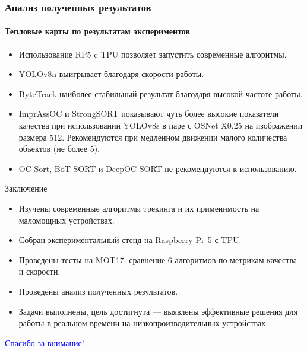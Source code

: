 \documentclass{beamer} %
\begin{document}
\begin{frame}
  \frametitle{Анализ полученных результатов}
  \framesubtitle{Тепловые карты по результатам экспериментов}
  \begin{itemize}
    \item Использование RP5 c TPU позволяет запустить современные алгоритмы.
    \item YOLOv8n выигрывает благодаря скорости работы.
    \item ByteTrack наиболее стабильный результат благодаря высокой частоте работы.
    \item ImprAssOC и StrongSORT показывают чуть более высокие показатели качества при использовании YOLOv8s в паре с OSNet X0.25 на изображении размера 512. Рекомендуются при медленном движении малого количества объектов (не более 5).
    \item OC-Sort, BoT-SORT и DeepOC-SORT не рекомендуются к использованию.
  \end{itemize}
\end{frame}

\begin{frame}{Заключение}
  \begin{itemize}
    \item Изучены современные алгоритмы трекинга и их применимость на маломощных устройствах.
    \item Собран экспериментальный стенд на Raspberry Pi 5 с TPU.
    \item Проведены тесты на MOT17: сравнение 6 алгоритмов по метрикам качества и скорости.
    \item Проведены анализ полученных результатов.
    \item Задачи выполнены, цель достигнута — выявлены эффективные решения для работы в реальном времени на низкопроизводительных устройствах.
  \end{itemize}
\end{frame}


\begin{frame}
  \centering \Huge \textcolor{blue}{Спасибо за внимание!}
\end{frame}
\end{document}
